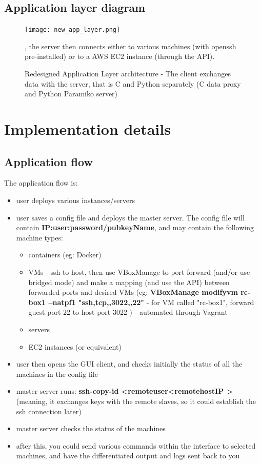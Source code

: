 \documentclass{llncs}
\begin{document}
\subsection{Application layer diagram}


\begin{figure}[!ht]
\texttt{[image: new\_app\_layer.png]}
\centering
\caption{Redesigned Application Layer architecture - The client exchanges data with the server, that is C and Python separately (C data proxy and Python Paramiko server)}, the server then connects either to various machines (with openssh pre-installed) or to a AWS EC2 instance (through the API).
\end{figure}


\FloatBarrier
%
\section{Implementation details}
%

\subsection{Application flow}

\iffalse %

The application flow is:
\begin{itemize}
  \item user deploys various instances/servers
  \item user saves a config file and deploys the master server. The config file will contain \textbf{IP:user:password/pubkeyName}, and may contain the following machine types:
  \begin{itemize}
  	\item containers (eg: Docker)
    \item VMs - ssh to host, then use VBoxManage to port forward (and/or use bridged mode) and make a mapping (and use the API) between forwarded ports and desired VMs (eg: \textbf{VBoxManage modifyvm rc-box1 --natpf1 "ssh,tcp,,3022,,22"} - for VM called "rc-box1", forward guest port 22 to host port 3022 ) - automated through Vagrant
    \item servers
    \item EC2 instances (or equivalent)
  \end{itemize}
  \item user then opens the GUI client, and checks initially the status of all the machines in the config file
  \item master server runs: \textbf{ssh-copy-id \textless remoteuser\textgreater@\textless remotehostIP \textgreater} (meaning, it exchanges keys with the remote slaves, so it could establish the ssh connection later)
  \item master server checks the status of the machines
  \item after this, you could send various commands within the interface to selected machines, and have the differentiated output and logs sent back to you
\end{itemize}
\end{document}
